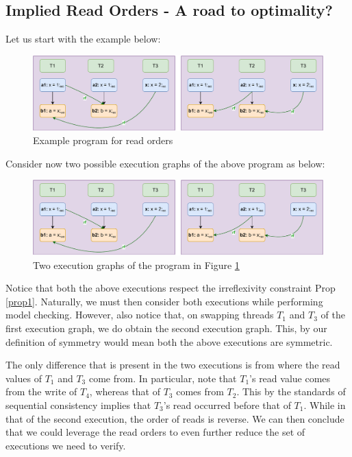 \subsection{Implied Read Orders - A road to optimality?}

    Let us start with the example below:
    \begin{figure}
        \centering
        \includegraphics{Equivalence_Example.pdf}
        \caption{Example program for read orders}
        \label{read_ord:ex1}
    \end{figure}

    Consider now two possible execution graphs of the above program as below:
    \begin{figure}
        \centering
        \includegraphics{Equivalence_Example.pdf}
        \caption{Two execution graphs of the program in Figure \ref{read_ord:ex1}}
        \label{read_ord:exec_ex1}
    \end{figure}

    Notice that both the above executions respect the irreflexivity constraint Prop \ref{prop1}.
    Naturally, we must then consider both executions while performing model checking.
    However, also notice that, on swapping threads $T_1$ and $T_3$ of the first execution graph, we do obtain the second execution graph.
    This, by our definition of symmetry would mean both the above executions are symmetric. 

    The only difference that is present in the two executions is from where the read values of $T_1$ and $T_3$ come from.
    In particular, note that $T_1$'s read value comes from the write of $T_4$, whereas that of $T_3$ comes from $T_2$.
    This by the standards of sequential consistency implies that $T_3$'s read occurred before that of $T_1$.
    While in that of the second execution, the order of reads is reverse. 
    We can then conclude that we could leverage the read orders to even further reduce the set of executions we need to verify.  

